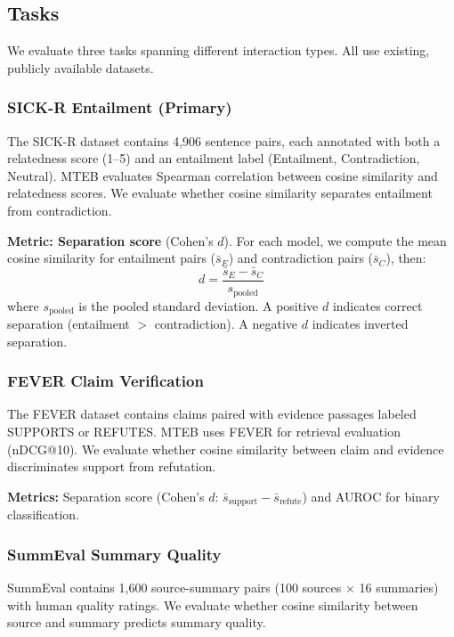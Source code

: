 \documentclass{article}
\begin{document}
\subsection{Tasks}

We evaluate three tasks spanning different interaction types. All use existing, publicly available datasets.

\subsubsection{SICK-R Entailment (Primary)}

The SICK-R dataset \citep{marelli2014sick} contains 4,906 sentence pairs, each annotated with both a relatedness score (1--5) and an entailment label (Entailment, Contradiction, Neutral). MTEB evaluates Spearman correlation between cosine similarity and relatedness scores. We evaluate whether cosine similarity separates entailment from contradiction.

\textbf{Metric: Separation score} (Cohen's $d$). For each model, we compute the mean cosine similarity for entailment pairs ($\bar{s}_E$) and contradiction pairs ($\bar{s}_C$), then:
\begin{equation}
    d = \frac{\bar{s}_E - \bar{s}_C}{s_{\text{pooled}}}
\end{equation}
where $s_{\text{pooled}}$ is the pooled standard deviation. A positive $d$ indicates correct separation (entailment $>$ contradiction). A negative $d$ indicates inverted separation.

\subsubsection{FEVER Claim Verification}

The FEVER dataset \citep{thorne2018fever} contains claims paired with evidence passages labeled SUPPORTS or REFUTES. MTEB uses FEVER for retrieval evaluation (nDCG@10). We evaluate whether cosine similarity between claim and evidence discriminates support from refutation.

\textbf{Metrics:} Separation score (Cohen's $d$: $\bar{s}_{\text{support}} - \bar{s}_{\text{refute}}$) and AUROC for binary classification.

\subsubsection{SummEval Summary Quality}

SummEval \citep{fabbri2021summeval} contains 1,600 source-summary pairs (100 sources $\times$ 16 summaries) with human quality ratings. We evaluate whether cosine similarity between source and summary predicts summary quality.
\end{document}
